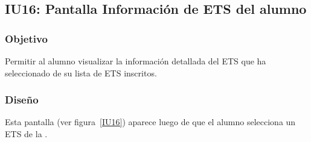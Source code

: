 \subsection{IU16: Pantalla Información de ETS del alumno}

\label{IU16}
\newpage

\subsubsection{Objetivo}
Permitir al alumno visualizar la información detallada del ETS que ha seleccionado de su lista de ETS inscritos.

\subsubsection{Diseño}
Esta pantalla  (ver figura~\ref{IU16}) aparece luego de que el alumno selecciona un ETS de la .

